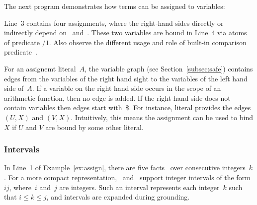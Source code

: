 \begin{example}\label{ex:assign}
The next program demonstrates how terms can be assigned to variables:%
%

%
Line~3 contains four assignments, where the right-hand sides directly or indirectly
depend on~ and~.
These two variables are bound in Line~4 via atoms of predicate /$1$.
Also observe the different usage and role of built-in comparison predicate~\code{==}.
\eexample
\end{example}

\begin{newstuff}
For an assignemt literal~$A$, the variable graph (see Section~\ref{subsec:safe}) contains edges from 
the variables of the right hand sight to the variables of the left hand side of~$A$.
If a variable on the right hand side occurs in the scope of an arithmetic function,
then no edge is added.
If the right hand side does not contain variables then edges start with~$\$$.
For instance, literal  provides the edges $(U,X)$ and $(V,X)$.
Intuitively, this means the assignment can be used to bind $X$ if $U$ and $V$ are bound by some other literal.
\end{newstuff}

\subsubsection{Intervals}\label{subsec:gringo:interval}

In Line~1 of Example~\ref{ex:assign},
there are five facts~
over consecutive integers~$k$.
For a more compact representation,
\gringo\ and \clingo\ support integer intervals of the form $i$$j$,
where~$i$ and~$j$ are integers.
Such an interval represents each integer~$k$ such that $i\leq k\leq j$,
and intervals are expanded during grounding.

